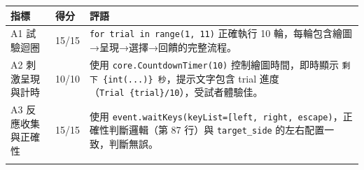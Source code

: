 \documentclass[14pt,]{extarticle}
\begin{document}
\begin{longtable}[]{@{}lll@{}}
\toprule
\begin{minipage}[b]{0.07\columnwidth}\raggedright
指標\strut
\end{minipage} & \begin{minipage}[b]{0.03\columnwidth}\raggedright
得分\strut
\end{minipage} & \begin{minipage}[b]{0.82\columnwidth}\raggedright
評語\strut
\end{minipage}\tabularnewline
\midrule
\endhead
\begin{minipage}[t]{0.07\columnwidth}\raggedright
A1 試驗迴圈\strut
\end{minipage} & \begin{minipage}[t]{0.03\columnwidth}\raggedright
15/15\strut
\end{minipage} & \begin{minipage}[t]{0.82\columnwidth}\raggedright
\texttt{for\ trial\ in\ range(1,\ 11)} 正確執行 10
輪，每輪包含繪圖→呈現→選擇→回饋的完整流程。\strut
\end{minipage}\tabularnewline
\begin{minipage}[t]{0.07\columnwidth}\raggedright
A2 刺激呈現與計時\strut
\end{minipage} & \begin{minipage}[t]{0.03\columnwidth}\raggedright
10/10\strut
\end{minipage} & \begin{minipage}[t]{0.82\columnwidth}\raggedright
使用 \texttt{core.CountdownTimer(10)} 控制繪圖時間，即時顯示
\texttt{剩下\ \{int(...)\}\ 秒}，提示文字包含 trial
進度（\texttt{Trial\ \{trial\}/10}），受試者體驗佳。\strut
\end{minipage}\tabularnewline
\begin{minipage}[t]{0.07\columnwidth}\raggedright
A3 反應收集與正確性\strut
\end{minipage} & \begin{minipage}[t]{0.03\columnwidth}\raggedright
15/15\strut
\end{minipage} & \begin{minipage}[t]{0.82\columnwidth}\raggedright
使用
\texttt{event.waitKeys(keyList={[}\textquotesingle{}left\textquotesingle{},\ \textquotesingle{}right\textquotesingle{},\ \textquotesingle{}escape\textquotesingle{}{]})}，正確性判斷邏輯（第
87 行）與 \texttt{target\_side} 的左右配置一致，判斷無誤。\strut
\end{minipage}\tabularnewline
\begin{minipage}[t]{0.07\columnwidth}\raggedright

\end{minipage}
\end{longtable}
\end{document}
